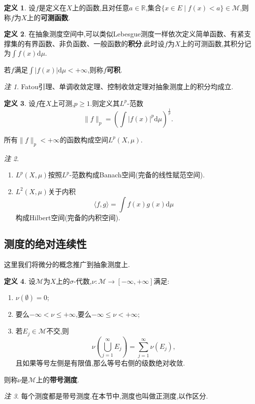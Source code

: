 \documentclass{ctexart}
\theoremstyle{definition}
\newtheorem{definition}{定义}
\theoremstyle{remark}
\newtheorem*{remark}{注}
\begin{document}
	\begin{definition}
		设$f$是定义在$X$上的函数,且对任意$a\in\mathbb{R}$,集合$\{x\in E\mid f(x)<a\}\in\mathcal{M}$,则称$f$为$X$上的\textbf{可测函数}.
	\end{definition}
	\begin{definition}
		在抽象测度空间中,可以类似Lebesgue测度一样依次定义简单函数、有紧支撑集的有界函数、非负函数、一般函数的\textbf{积分}.此时设$f$为$X$上的可测函数,其积分记为$\int{f(x)\mathrm{d}\mu}$.
		
		若$f$满足$\int{|f(x)|\mathrm{d}\mu}<+\infty$,则称$f$\textbf{可积}.
	\end{definition}
	\begin{remark}
		Fatou引理、单调收敛定理、控制收敛定理对抽象测度上的积分均成立.
	\end{remark}
	\begin{definition}
		设$f$在$X$上可测,$p\ge 1$.则定义其$L^p$-范数
		$$\|f\|_p=\left(\int{|f(x)|^p\mathrm{d}\mu}\right)^\frac{1}{p}.$$
		
		所有$\|f\|_p<+\infty$的函数构成空间$L^p(X,\mu)$.
	\end{definition}
	\begin{remark}
		\begin{enumerate}
			\item $L^p(X,\mu)$按照$L^p$-范数构成Banach空间(完备的线性赋范空间).
			\item $L^2(X,\mu)$关于内积
			$$\langle f,g\rangle=\int{f(x)g(x)\mathrm{d}\mu}$$
			构成Hilbert空间(完备的内积空间).
		\end{enumerate}
	\end{remark}
	
	\subsection{测度的绝对连续性}
	这里我们将微分的概念推广到抽象测度上.
	
	\begin{definition}
		设$\mathcal{M}$为$X$上的$\sigma$-代数,$\nu:\mathcal{M}\to[-\infty,+\infty]$满足:
		\begin{enumerate}
			\item $\nu(\emptyset)=0$;
			\item 要么$-\infty<\nu\le+\infty$,要么$-\infty\le\nu<+\infty$;
			\item 若$E_j\in\mathcal{M}$不交,则
			$$\nu\left(\bigcup_{j=1}^\infty{E_j}\right)=\sum_{j=1}^\infty{\nu(E_j)},$$
			且如果等号左侧是有限值,那么等号右侧的级数绝对收敛.
		\end{enumerate}
		则称$\nu$是$\mathcal{M}$上的\textbf{带号测度}.
	\end{definition}
	\begin{remark}
		每个测度都是带号测度.在本节中,测度也叫做正测度,以作区分.
	\end{remark}
	
\end{document}
